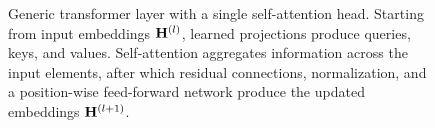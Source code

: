 \begin{figure}[H]
{}
\caption{Generic transformer layer with a single self-attention head. Starting from input embeddings $\mathbf{H}^{(l)}$, learned projections produce queries, keys, and values. Self-attention aggregates information across the input elements, after which residual connections, normalization, and a position-wise feed-forward network produce the updated embeddings $\mathbf{H}^{(l+1)}$.}
\label{fig:background_transformer_layer}
\end{figure}
